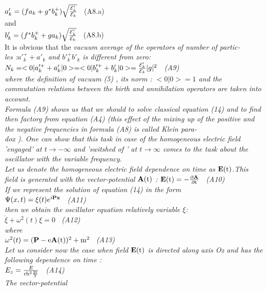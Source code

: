 \documentclass[a4paper,12pt] {article}
\begin{document}
\\$ a'_k = (f a_k+g^*b_k^+) \sqrt {\frac {{\cal E}'_k}{{\cal E}_k}} $ \ (A8.a)\\ and
\\ $b'_k = (f^*b_k^+ + g a_k) \sqrt {\frac {{\cal E}'_k}{{\cal E}_k}} $ \ (A8.b)
\\ It is obvious that the  \it vacuum average of the operators of number of  partic-\\les \rm
 :$ a'^+ _k+ a'_k$  and $ b'^+ _k b'_k$  \it  is different from zero\rm :
\\$ N_k = <0\vert a'^+_k +a'_k\vert 0> =<0\vert b'^+_k +b'_k\vert 0> =\frac {{\cal E}'_k}{{\cal E}_k}\vert g\vert ^2 $ \ (A9)
\\ where the definition of vacuum (5) , its norm : $ <0\vert 0 >=1 $ and the commutation relations between the birth and annihilation operators  are taken into account.
\\ Formula (A9) shows us that \it  we should to solve classical equation \rm  (14)  \it and to find then
 factor\rm  g  \it from equation \rm  (A4) (this effect of the \it  mixing up of the positive and the negative
 frequencies in  formula \rm (A8) \it is called  Klein para-\\dox \rm ). One can show that this task in  case of
 the homogeneous electric field  'engaged' at $ t \to -\infty $ and  'switshed of ' at $ t \to \infty $ comes to
 the \it  task about the oscillator with the variable frequency.\\ \rm Let us denote the homogeneous
electric field dependence on time as $\bf  E\rm (t)$.This field is generated with the vector-potential
$\bf A \rm (t)$ : $\bf E \rm (t) = -\frac {\partial \bf A }{\partial \rm  t} $ \ (A10)\\ If we represent the
 solution of equation (14) in the form \\ $\Psi (x,t) = \xi(t)e^{i \bf P \bf x} $ \ (A11)\\ then we obtain \it
the  oscillator equation \rm relatively   variable $\xi$:\\ $ \ddot \xi+\omega ^2(t) \xi =0 $ \ (A12)\\ where
\\ $ \omega ^2(t) = (\bf P-\rm e \bf A\rm (t))^2+m^2 $ \ (A13)\\ Let us consider now the case when  field
$ \bf E\rm (t)$ is directed along axis Oz and has the following dependence on time :
\\$ E_z = \frac {E}{\rm ch^2 {\frac {2t}{T}}} $ \ (A14)\\ The vector-potential
\end{document}
